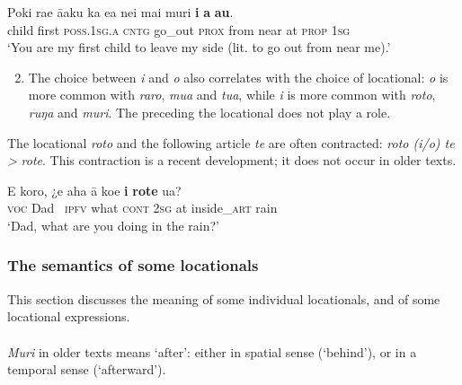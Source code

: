 \ea\label{ex:3.140}
\gll Poki ra{\ꞌ}e {\ꞌ}ā{\ꞌ}aku ka e{\ꞌ}a nei mai muri \textbf{i} \textbf{a} \textbf{au}.\\
child first \textsc{poss.1sg.a} \textsc{cntg} go\_out \textsc{prox} from near at \textsc{prop} \textsc{1sg}\\

\glt
‘You are my first child to leave my side (lit. to go out from near me).’ \textstyleExampleref{[R210.049]} 
\z

\begin{enumerate}
\setcounter{enumi}{1}
\item 
The choice between \textit{i} and \textit{o} also correlates with the choice of locational: \textit{o} is more common with \textit{raro}, \textit{mu{\ꞌ}a} and \textit{tu{\ꞌ}a}, while \textit{i} is more common with \textit{roto}, \textit{ruŋa} and \textit{muri}. The  preceding the locational does not play a role.

\end{enumerate}

The locational \textit{roto} and the following article \textit{te} are often contracted: \textit{roto (i/o) te {\textgreater}} \textit{rote}. This contraction is a recent development; it does not occur in older texts. 

\ea\label{ex:3.141}
\gll E koro, ¿e aha {\ꞌ}ā koe \textbf{{\ꞌ}i} \textbf{rote} {\ꞌ}ua? \\
\textsc{voc} Dad ~\textsc{ipfv} what \textsc{cont} \textsc{2sg} at inside\_\textsc{art} rain \\

\glt 
‘Dad, what are you doing in the rain?’ \textstyleExampleref{[R210.097]} 
\z

\subsubsection[The semantics of some locationals]{The semantics of some locationals}\label{sec:3.6.2.3}
This section discusses the meaning of some individual locationals, and of some locational expressions.

\paragraph{}\label{sec:3.6.2.3.1} \textit{Muri} in older texts means ‘after’: either in spatial sense (‘behind’), or in a temporal sense (‘afterward’). 

